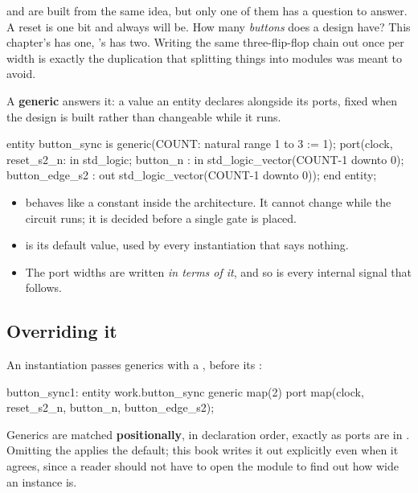 and  are built from the same idea, but only one of them has a
question to answer. A reset is one bit and always will be. How many \emph{buttons} does a design
have? This chapter's  has one, 's  has two.
Writing the same three-flip-flop chain out once per width is exactly the duplication that splitting
things into modules was meant to avoid.

A \textbf{generic} answers it: a value an entity declares alongside its ports, fixed when the design
is built rather than changeable while it runs.

\begin{vhdlcode}
entity button_sync is
    generic(COUNT: natural range 1 to 3 := 1);
    port(clock, reset_s2_n: in  std_logic;
         button_n         : in  std_logic_vector(COUNT-1 downto 0);
         button_edge_s2   : out std_logic_vector(COUNT-1 downto 0));
end entity;
\end{vhdlcode}

\begin{itemize}
  \item {} behaves like a constant inside the architecture. It cannot change while the
    circuit runs; it is decided before a single gate is placed.
  \item {} is its default value, used by every instantiation that says nothing.
  \item The port widths are written \emph{in terms of it}, and so is every internal signal that
    follows.
\end{itemize}

\subsection*{Overriding it}
An instantiation passes generics with a , before its :

\begin{vhdlcode}
button_sync1: entity work.button_sync
    generic map(2)
    port map(clock, reset_s2_n, button_n, button_edge_s2);
\end{vhdlcode}

Generics are matched \textbf{positionally}, in declaration order, exactly as ports are in
. Omitting the  applies the default; this book writes it
out explicitly even when it agrees, since a reader should not have to open the module to find out
how wide an instance is.

